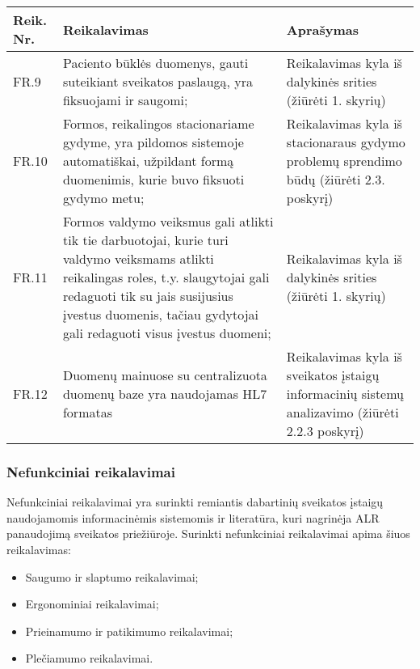 \begin{table}[!ht]
    \centering
    \renewcommand{\arraystretch}{1.2}
    \begin{tabular}{|m{3em}|m{17em}|m{17em}|}
    \hline 
    \rowcolor[HTML]{EFEFEF} 
    Reik. Nr. & Reikalavimas & Aprašymas \\ \hline

    FR.9  &  Paciento būklės duomenys, gauti suteikiant sveikatos paslaugą, yra fiksuojami ir saugomi;  &    Reikalavimas kyla iš dalykinės srities (žiūrėti 1. skyrių)       \\ \hline
    FR.10  &  Formos, reikalingos stacionariame gydyme, yra pildomos sistemoje automatiškai, užpildant formą duomenimis, kurie buvo fiksuoti gydymo metu;  &   Reikalavimas kyla iš stacionaraus gydymo problemų sprendimo būdų  (žiūrėti 2.3. poskyrį)       \\ \hline
    FR.11  &  Formos valdymo veiksmus gali atlikti tik tie darbuotojai, kurie turi valdymo veiksmams atlikti reikalingas roles, t.y. slaugytojai gali redaguoti tik su jais susijusius įvestus duomenis, tačiau gydytojai gali redaguoti visus įvestus duomeni;  &   Reikalavimas kyla iš dalykinės srities (žiūrėti 1. skyrių)       \\ \hline
    FR.12  &  Duomenų mainuose su centralizuota duomenų baze yra naudojamas HL7 formatas  &   Reikalavimas kyla iš sveikatos įstaigų informacinių sistemų analizavimo (žiūrėti 2.2.3 poskyrį)       \\ \hline
    \end{tabular}
\end{table}


\subsubsection{Nefunkciniai reikalavimai}
Nefunkciniai reikalavimai yra surinkti remiantis dabartinių sveikatos įstaigų naudojamomis informacinėmis sistemomis ir literatūra, kuri nagrinėja ALR panaudojimą sveikatos priežiūroje. Surinkti nefunkciniai reikalavimai apima šiuos reikalavimas:
\begin{itemize}
    \item Saugumo ir slaptumo reikalavimai;
    \item Ergonominiai reikalavimai;
    \item Prieinamumo ir patikimumo reikalavimai;
    \item Plečiamumo reikalavimai.
\end{itemize}

